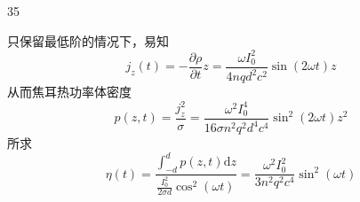 \begin{solution}{35}
    \begin{subsolution}
        只保留最低阶的情况下，易知
        \begin{equation}
            j _ {z} (t) = - \frac {\partial \rho}{\partial t} z = \frac {\omega I _ {0} ^ {2}}{4 n q d ^ {2} c ^ {2}} \sin (2 \omega t) z
            \label{eq:25.s35}
        \end{equation}
        从而焦耳热功率体密度
        \begin{equation}
            p (z, t) = \frac {j _ {z} ^ {2}}{\sigma} = \frac {\omega^ {2} I _ {0} ^ {4}}{1 6 \sigma n ^ {2} q ^ {2} d ^ {4} c ^ {4}} \sin^ {2} (2 \omega t) z ^ {2}
            \label{eq:26.s35}
        \end{equation}
        所求
        \begin{equation}
            \eta (t) = \frac {\int_ {- d} ^ {d} p (z , t) \mathrm{d} z}{\frac {I _ {0} ^ {2}}{2 \sigma d} \cos^ {2} (\omega t)} = \frac {\omega^ {2} I _ {0} ^ {2}}{3 n ^ {2} q ^ {2} c ^ {4}} \sin^ {2} (\omega t)
            \label{eq:27.s35}
        \end{equation}
    \end{subsolution}
\end{solution}